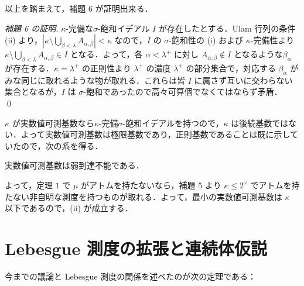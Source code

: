 \documentclass[a4j]{jsarticle}
\begin{document}
以上を踏まえて，補題 $6$ が証明出来る．
\begin{proof}[補題 6 の証明]
 $\kappa$-完備な$\sigma$-飽和イデアル $I$ が存在したとする．Ulam 行列の条件 (ii) より，$|\kappa \setminus \bigcup_{\beta < \lambda} A_{\alpha, \beta}| < \kappa$ なので，$I$ の $\sigma$-飽和性の (i) および $\kappa$-完備性より $\kappa \setminus \bigcup_{\beta < \lambda} A_{\alpha, \beta} \in I$ となる．よって，各 $\alpha < \lambda^+$ に対し $A_{\alpha, \beta} \notin I$ となるような$\beta_\alpha$ が存在する．$\kappa = \lambda^+$ の正則性より $\lambda^+$ の濃度 $\lambda^+$ の部分集合で，対応する $\beta_\alpha$ がみな同じに取れるような物が取れる．これらは皆 $I$ に属さず互いに交わらない集合となるが，$I$ は $\sigma$-飽和であったので高々可算個でなくてはならず矛盾． \qed
\end{proof}

$\kappa$ が実数値可測基数なら$\kappa$-完備$\sigma$-飽和イデアルを持つので，$\kappa$ は後続基数ではない．よって実数値可測基数は極限基数であり，正則基数であることは既に示していたので，次の系を得る．

\begin{corollary}
 実数値可測基数は弱到達不能である．
\end{corollary}

よって，定理 $1$ で $\mu$ がアトムを持たないなら，補題 $5$ より $\kappa \leq 2^\omega$ でアトムを持たない非自明な測度を持つものが取れる．よって，最小の実数値可測基数は $\kappa$ 以下であるので，(ii) が成立する．

\section{Lebesgue 測度の拡張と連続体仮説}
今までの議論と Lebesgue 測度の関係を述べたのが次の定理である：
\end{document}
